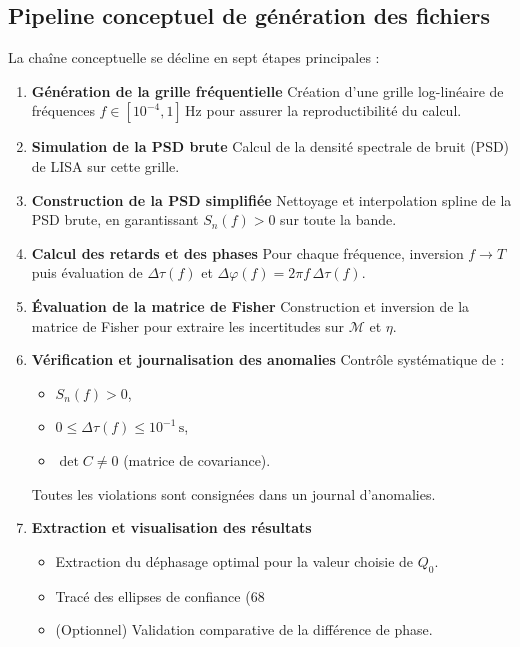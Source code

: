 \subsection{Pipeline conceptuel de génération des fichiers}
La chaîne conceptuelle se décline en sept étapes principales :

\begin{enumerate}
  \item \textbf{Génération de la grille fréquentielle}  
    Création d’une grille log-linéaire de fréquences $f\in[10^{-4},1]\,$Hz
    pour assurer la reproductibilité du calcul.

  \item \textbf{Simulation de la PSD brute}  
    Calcul de la densité spectrale de bruit (PSD) de LISA sur cette grille.

  \item \textbf{Construction de la PSD simplifiée}  
    Nettoyage et interpolation spline de la PSD brute, en garantissant
    $S_n(f)>0$ sur toute la bande.

  \item \textbf{Calcul des retards et des phases}  
    Pour chaque fréquence, inversion $f\to T$ puis évaluation de
    \(\Delta\tau(f)\) et \(\Delta\varphi(f)=2\pi f\,\Delta\tau(f)\).

  \item \textbf{Évaluation de la matrice de Fisher}  
    Construction et inversion de la matrice de Fisher pour extraire les
    incertitudes sur \(\mathcal{M}\) et \(\eta\).

  \item \textbf{Vérification et journalisation des anomalies}  
    Contrôle systématique de :
    \begin{itemize}
      \item \(S_n(f)>0\),  
      \item \(0 \le \Delta\tau(f)\le 10^{-1}\,\mathrm{s}\),  
      \item \(\det C \neq 0\) (matrice de covariance).
    \end{itemize}
    Toutes les violations sont consignées dans un journal d’anomalies.

  \item \textbf{Extraction et visualisation des résultats}  
    \begin{itemize}
      \item Extraction du déphasage optimal pour la valeur choisie de \(Q_0\).  
      \item Tracé des ellipses de confiance (68 %
      \item (Optionnel) Validation comparative de la différence de phase.
    \end{itemize}
\end{enumerate}

